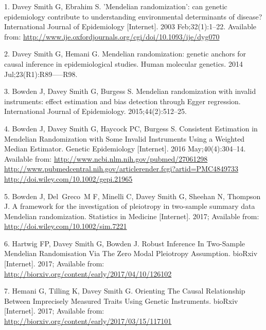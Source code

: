 \documentclass[]{article}
\begin{document}
\raggedright

\hypertarget{refs}{}
\hypertarget{ref-DaveySmith2003}{}
1. Davey Smith G, Ebrahim S. 'Mendelian randomization': can genetic
epidemiology contribute to understanding environmental determinants of
disease? International Journal of Epidemiology {[}Internet{]}. 2003
Feb;32(1):1--22. Available from:
\url{http://www.ije.oxfordjournals.org/cgi/doi/10.1093/ije/dyg070}

\hypertarget{ref-DaveySmithHemani2014}{}
2. Davey Smith G, Hemani G. Mendelian randomization: genetic anchors for
causal inference in epidemiological studies. Human molecular genetics.
2014 Jul;23(R1):R89-----R98.

\hypertarget{ref-Bowden2015}{}
3. Bowden J, Davey Smith G, Burgess S. Mendelian randomization with
invalid instruments: effect estimation and bias detection through Egger
regression. International Journal of Epidemiology. 2015;44(2):512--25.

\hypertarget{ref-Bowden2016b}{}
4. Bowden J, Davey Smith G, Haycock PC, Burgess S. Consistent Estimation
in Mendelian Randomization with Some Invalid Instruments Using a
Weighted Median Estimator. Genetic Epidemiology {[}Internet{]}. 2016
May;40(4):304--14. Available from:
\href{http://www.ncbi.nlm.nih.gov/pubmed/27061298\%20http://www.pubmedcentral.nih.gov/articlerender.fcgi?artid=PMC4849733\%20http://doi.wiley.com/10.1002/gepi.21965}{http://www.ncbi.nlm.nih.gov/pubmed/27061298 http://www.pubmedcentral.nih.gov/articlerender.fcgi?artid=PMC4849733 http://doi.wiley.com/10.1002/gepi.21965}

\hypertarget{ref-Bowden2017}{}
5. Bowden J, Del~Greco~M F, Minelli C, Davey Smith G, Sheehan N,
Thompson J. A framework for the investigation of pleiotropy in
two-sample summary data Mendelian randomization. Statistics in Medicine
{[}Internet{]}. 2017; Available from:
\url{http://doi.wiley.com/10.1002/sim.7221}

\hypertarget{ref-Hartwig2017}{}
6. Hartwig FP, Davey Smith G, Bowden J. Robust Inference In Two-Sample
Mendelian Randomisation Via The Zero Modal Pleiotropy Assumption.
bioRxiv {[}Internet{]}. 2017; Available from:
\url{http://biorxiv.org/content/early/2017/04/10/126102}

\hypertarget{ref-Hemani2017}{}
7. Hemani G, Tilling K, Davey Smith G. Orienting The Causal Relationship
Between Imprecisely Measured Traits Using Genetic Instruments. bioRxiv
{[}Internet{]}. 2017; Available from:
\url{http://biorxiv.org/content/early/2017/03/15/117101}
\end{document}
